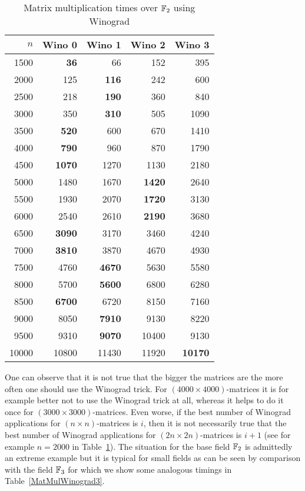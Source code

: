 \begin{table}[ht]
\begin{center}
\begin{tabular}{|r||r|r|r|r|}
\hline
$n$ & Wino 0 & Wino 1 & Wino 2 & Wino 3 \\
\hline
1500 & \textbf{36}     &66   & 152    &395      \\
2000 & 125    &\textbf{116}  & 242    &600      \\
2500 & 218    &\textbf{190}  & 360    &840      \\
3000 & 350    &\textbf{310}  & 505    &1090      \\
3500 & \textbf{520}    &600  & 670    &1410      \\
4000 & \textbf{790}    &960  & 870    &1790      \\
4500 & \textbf{1070}   &1270 & 1130   &2180      \\
5000 & 1480   &1670 & \textbf{1420}   &2640      \\
5500 & 1930   &2070 & \textbf{1720}   &3130      \\
6000 & 2540   &2610 & \textbf{2190}   &3680      \\
6500 & \textbf{3090}   &3170 & 3460   &4240      \\
7000 & \textbf{3810}   &3870 & 4670   &4930      \\
7500 & 4760   &\textbf{4670} & 5630   &5580      \\
8000 & 5700   &\textbf{5600} & 6800   &6280      \\
8500 & \textbf{6700}   &6720 & 8150   &7160      \\
9000 & 8050   &\textbf{7910} & 9130   &8220      \\
9500 & 9310   &\textbf{9070} & 10400  &9130      \\
10000 &10800  &11430&  11920 & \textbf{10170}     \\
\hline
\end{tabular}
\end{center}
\caption{Matrix multiplication times over $\mathbb{F}_2$ using Winograd}
\label{MatMulWinograd2}
\end{table}

One can observe that it is not true that the bigger the matrices are
the more often one should use the Winograd trick. For $(4000 \times
4000)$-matrices it is for example better not to use the Winograd trick
at all, whereas it helps to do it once for $(3000 \times
3000)$-matrices. Even worse, if the best number of
Winograd applications for $(n \times n)$-matrices is $i$, then it 
is not necessarily true that the best number of Winograd applications
for $(2n \times 2n)$-matrices is $i+1$ (see for example $n=2000$ in 
Table~\ref{MatMulWinograd2}). The situation for the base field 
$\mathbb{F}_2$ is admittedly an extreme example but it is typical for small
fields as can be seen by comparison with the field $\mathbb{F}_3$ for which we
show some analogous timings in Table~\ref{MatMulWinograd3}.

